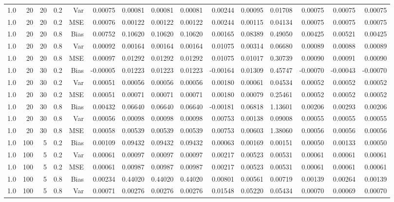 \begin{table}[!htbp]
\begin{tabular}{lrrrrrrrrrrrrrr}
1.0 &  20 & 20 & 0.2 & Var & 0.00075 & 0.00081 & 0.00081 & 0.00081 & 0.00244 & 0.00095 & 0.01708 & 0.00075 & 0.00075 & 0.00075 \\
1.0 &  20 & 20 & 0.2 & MSE & 0.00076 & 0.00122 & 0.00122 & 0.00122 & 0.00244 & 0.00115 & 0.04134 & 0.00075 & 0.00075 & 0.00075 \\
1.0 &  20 & 20 & 0.8 & Bias & 0.00752 & 0.10620 & 0.10620 & 0.10620 & 0.00165 & 0.08389 & 0.49050 & 0.00425 & 0.00521 & 0.00425 \\
1.0 &  20 & 20 & 0.8 & Var & 0.00092 & 0.00164 & 0.00164 & 0.00164 & 0.01075 & 0.00314 & 0.06680 & 0.00089 & 0.00088 & 0.00089 \\
1.0 &  20 & 20 & 0.8 & MSE & 0.00097 & 0.01292 & 0.01292 & 0.01292 & 0.01075 & 0.01017 & 0.30739 & 0.00090 & 0.00091 & 0.00090 \\
1.0 &  20 & 30 & 0.2 & Bias & -0.00005 & 0.01223 & 0.01223 & 0.01223 & -0.00164 & 0.01309 & 0.45747 & -0.00070 & -0.00043 & -0.00070 \\
1.0 &  20 & 30 & 0.2 & Var & 0.00051 & 0.00056 & 0.00056 & 0.00056 & 0.00180 & 0.00061 & 0.04534 & 0.00052 & 0.00052 & 0.00052 \\
1.0 &  20 & 30 & 0.2 & MSE & 0.00051 & 0.00071 & 0.00071 & 0.00071 & 0.00180 & 0.00079 & 0.25461 & 0.00052 & 0.00052 & 0.00052 \\
1.0 &  20 & 30 & 0.8 & Bias & 0.00432 & 0.06640 & 0.06640 & 0.06640 & -0.00181 & 0.06818 & 1.13601 & 0.00206 & 0.00293 & 0.00206 \\
1.0 &  20 & 30 & 0.8 & Var & 0.00056 & 0.00098 & 0.00098 & 0.00098 & 0.00753 & 0.00138 & 0.09008 & 0.00055 & 0.00055 & 0.00055 \\
1.0 &  20 & 30 & 0.8 & MSE & 0.00058 & 0.00539 & 0.00539 & 0.00539 & 0.00753 & 0.00603 & 1.38060 & 0.00056 & 0.00056 & 0.00056 \\
1.0 & 100 &  5 & 0.2 & Bias & 0.00109 & 0.09432 & 0.09432 & 0.09432 & 0.00063 & 0.00169 & 0.00151 & 0.00050 & 0.00133 & 0.00050 \\
1.0 & 100 &  5 & 0.2 & Var & 0.00061 & 0.00097 & 0.00097 & 0.00097 & 0.00217 & 0.00523 & 0.00531 & 0.00061 & 0.00061 & 0.00061 \\
1.0 & 100 &  5 & 0.2 & MSE & 0.00061 & 0.00987 & 0.00987 & 0.00987 & 0.00217 & 0.00523 & 0.00531 & 0.00061 & 0.00061 & 0.00061 \\
1.0 & 100 &  5 & 0.8 & Bias & 0.00234 & 0.44020 & 0.44020 & 0.44020 & 0.00801 & 0.00561 & 0.00719 & 0.00139 & 0.00264 & 0.00139 \\
1.0 & 100 &  5 & 0.8 & Var & 0.00071 & 0.00276 & 0.00276 & 0.00276 & 0.01548 & 0.05220 & 0.05434 & 0.00070 & 0.00069 & 0.00070 \\

\end{tabular}
\end{table}
